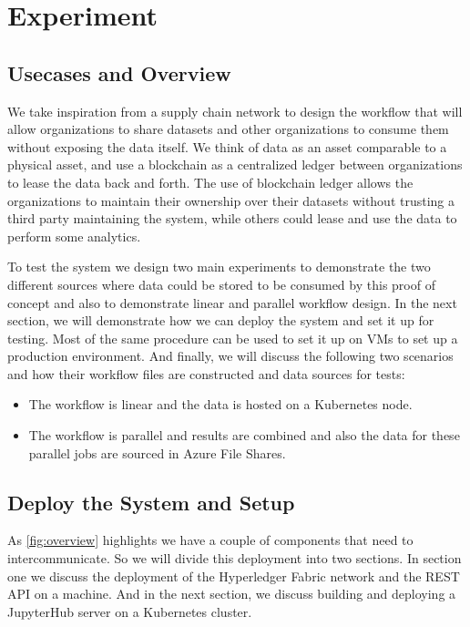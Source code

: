 
\chapter{Experiment}
\label{ch:eval}

\section{Usecases and Overview}
We take inspiration from a supply chain network to design the workflow that will allow organizations to share datasets and other organizations to consume them without exposing the data itself. We think of data as an asset comparable to a physical asset, and use a blockchain as a centralized ledger between organizations to lease the data back and forth. The use of blockchain ledger allows the organizations to maintain their ownership over their datasets without trusting a third party maintaining the system, while others could lease and use the data to perform some analytics.

\bigskip
To test the system we design two main experiments to demonstrate the two different sources where data could be stored to be consumed by this proof of concept and also to demonstrate linear and parallel workflow design. In the next section, we will demonstrate how we can deploy the system and set it up for testing. Most of the same procedure can be used to set it up on VMs to set up a production environment. And finally, we will discuss the following two scenarios and how their workflow files are constructed and data sources for tests:

\begin{itemize}
    \item The workflow is linear and the data is hosted on a Kubernetes node.
    \item The workflow is parallel and results are combined and also the data for these parallel jobs are sourced in Azure File Shares.
\end{itemize}

\section{Deploy the System and Setup}
As \ref{fig:overview} highlights we have a couple of components that need to intercommunicate. So we will divide this deployment into two sections. In section one we discuss the deployment of the Hyperledger Fabric network and the REST API on a machine. And in the next section, we discuss building and deploying a JupyterHub server on a Kubernetes cluster. 

